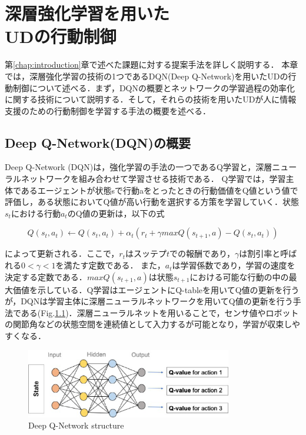 \documentclass[12pt]{sonota/aislab}
\begin{document}
\chapter{深層強化学習を用いた \\ UDの行動制御}\label{chap:proposal}
第\ref{chap:introduction}章で述べた課題に対する提案手法を詳しく説明する．
本章では，深層強化学習の技術の1つであるDQN(Deep Q-Network)を用いたUDの行動制御について述べる．まず，DQNの概要とネットワークの学習過程の効率化に関する技術について説明する．そして，それらの技術を用いたUDが人に情報支援のための行動制御を学習する手法の概要を述べる．

\section{Deep Q-Network(DQN)の概要}
Deep Q-Network (DQN)は，強化学習の手法の一つであるQ学習と，深層ニューラルネットワークを組み合わせて学習させる技術である\cite{drl}． Q学習では，学習主体であるエージェントが状態sで行動aをとったときの行動価値をQ値という値で評価し，ある状態においてQ値が高い行動を選択する方策を学習していく．状態$s_{t}$における行動$a_{t}$のQ値の更新は，以下の式

\begin{equation}
\label{q_update}
Q(s_{t},a_{t} )←Q(s_{t},a_{t} )+ α_{t} (r_{t}+ \gamma maxQ(s_{t+1},a)-Q(s_{t},a_{t}))
\end{equation}

によって更新される．ここで，$r_{t}$はスッテプ$t$での報酬であり，$\gamma$は割引率と呼ばれる$ 0 < \gamma <1 $を満たす定数である．
また，$a_{t}$は学習係数であり，学習の速度を決定する定数である．$maxQ(s_{t+1},a)$は状態$s_{t+1}$における可能な行動の中の最大価値を示している．Q学習はエージェントにQ-tableを用いてQ値の更新を行うが，DQNは学習主体に深層ニューラルネットワークを用いてQ値の更新を行う手法である(Fig.\ref{DQN})．深層ニューラルネットを用いることで，センサ値やロボットの関節角などの状態空間を連続値として入力するが可能となり，学習が収束しやすくなる．


\begin{figure}[t]
\begin{center}
\includegraphics[clip, width=9cm]{figs/dqn_structure.eps}
\caption{Deep Q-Network structure}
\label{DQN}
\end{center}
\end{figure}
\end{document}
